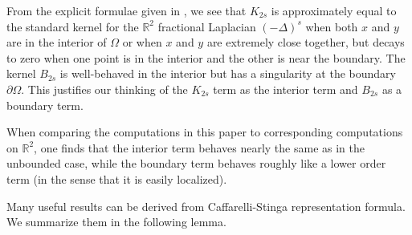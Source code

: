\documentclass[11pt]{amsart}
\theoremstyle{remark}
\theoremstyle{definition}
\newcommand{\R}{\mathbb{R}}
\newcommand{\del}{\partial}
\newcommand{\Laplace}{\Delta}
\begin{document}
From the explicit formulae given in \cite{CaSt}, we see that $K_{2s}$ is approximately equal to the standard kernel for the $\R^2$ fractional Laplacian $(-\Laplace)^s$ when both $x$ and $y$ are in the interior of $\Omega$ or when $x$ and $y$ are extremely close together, but decays to zero when one point is in the interior and the other is near the boundary.  The kernel $B_{2s}$ is well-behaved in the interior but has a singularity at the boundary $\del \Omega$.  This justifies our thinking of the $K_{2s}$ term as the interior term and $B_{2s}$ as a boundary term.  

When comparing the computations in this paper to corresponding computations on $\R^2$, one finds that the interior term behaves nearly the same as in the unbounded case, while the boundary term behaves roughly like a lower order term (in the sense that it is easily localized).  

Many useful results can be derived from Caffarelli-Stinga representation formula.  We summarize them in the following lemma.  
\end{document}
